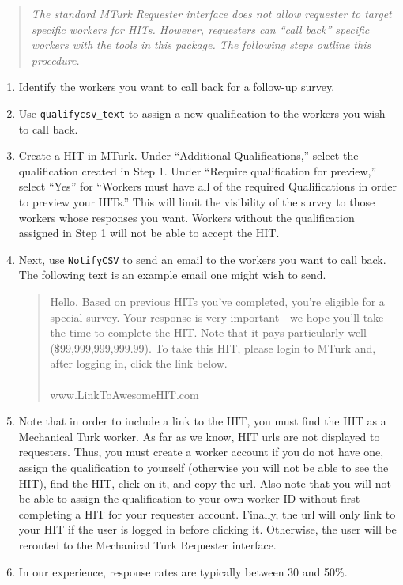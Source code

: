 \documentclass[10pt]{article}
\begin{document}
\begin{quotation}
\noindent \emph{The standard MTurk Requester interface does not allow requester
to target specific workers for HITs. However, requesters can ``call back'' specific
workers with the tools in this package. The following steps outline this procedure.}
\end{quotation}

\begin{enumerate}
  \item Identify the workers you want to call back for a follow-up survey.
  \item Use \verb+qualifycsv_text+ to assign a new qualification to the workers you wish to call back.
  \item Create a HIT in MTurk. Under ``Additional Qualifications,'' select the qualification created in Step 1. Under 
    ``Require qualification for preview,'' select ``Yes'' for ``Workers must have all of the required Qualifications in order to preview your 
    HITs.'' This will limit the visibility of the survey to those workers whose responses you want. Workers without the qualification assigned
    in Step 1 will not be able to accept the HIT.
 \item Next, use \verb+NotifyCSV+ to send an email to the workers you want to call back. The following text is an example email one 
might wish to send.
\begin{quotation}
\noindent Hello. Based on previous HITs you've completed, you're eligible for a special survey. Your response is very important - we hope you'll take the
time to complete the HIT. Note that it pays particularly well (\$99,999,999,999.99). To take this HIT, please login to MTurk and, after logging
in, click the link below.\\
\\
www.LinkToAwesomeHIT.com
\end{quotation}

\item Note that in order to include a link to the HIT, you must find the HIT as a Mechanical Turk worker. As far as we know, HIT urls are 
not displayed to requesters. Thus, you must create a worker account if you do not have one, assign the qualification to yourself (otherwise you
will not be able to see the HIT), find the HIT, click on it, and copy the url. Also note that you will not be able to assign the qualification
to your own worker ID without first completing a HIT for your requester account. Finally, the url will only link to your HIT if the user is
logged in before clicking it. Otherwise, the user will be rerouted to the Mechanical Turk Requester interface.

\item In our experience, response rates are typically between 30 and 50\%. 

\end{enumerate}
\newpage
\appendix
\end{document}
